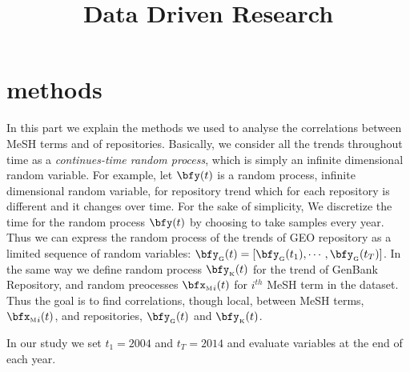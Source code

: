 \documentclass[twoside,11pt]{article}
\def\bfyg{\bfy_{\text{\tiny G}}}
\def\bfyk{\bfy_{\text{\tiny K}}}
\def\bfxm{{\bfx_{\text{\tiny M}}}}
\begin{document}
\title{Data Driven Research}


\editor{}

\maketitle



\section{methods} 
In this part we explain the methods we used to analyse the correlations between MeSH terms and of repositories.
Basically, we consider all the trends throughout time as a \emph{continues-time random process}, which is simply an infinite dimensional random variable. For example, let $\bfy(t)$ is a random process, infinite dimensional random variable, for repository trend which for each repository is different and it changes over time. For the sake of simplicity, We discretize the time for the random process $\bfy(t)$ by choosing to take samples every year. Thus we can express the random process of the trends of GEO repository as a limited sequence of random variables: $\bfyg (t) = [\bfyg(t_1), \cdots, \bfyg(t_T) ]$.  In the same way we define random process $\bfyk(t)$ for the trend  of GenBank Repository, and random preocesses $\bfxm_i(t)$ for $i^{th}$ MeSH term in the dataset. Thus the goal is to find correlations, though local, between MeSH terms, $\bfxm_i(t)$, and repositories, $\bfyg(t)$ and $\bfyk(t)$.

In our study we set $t_1=2004$ and $t_T=2014$ and evaluate variables at the end of each year.
\end{document}
